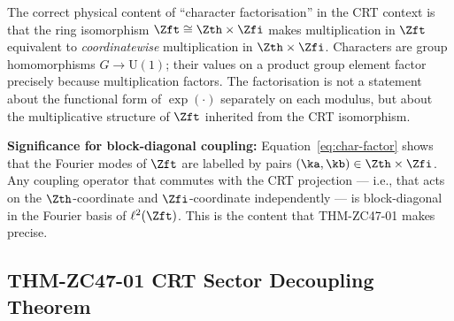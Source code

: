 \documentclass[12pt, a4paper]{article}
\begin{document}
\begin{derivedbox}[title={Commentary on LEM-ZC47-02}]
The correct physical content of ``character factorisation'' in
the CRT context is that the ring isomorphism $\Zft \cong \Zth \times \Zfi$
makes multiplication in $\Zft$ equivalent to \emph{coordinatewise}
multiplication in $\Zth \times \Zfi$.
Characters are group homomorphisms $G \to \mathrm{U}(1)$; their
values on a product group element factor precisely because
multiplication factors.
The factorisation is not a statement about the functional form
of $\exp(\cdot)$ separately on each modulus, but about the
multiplicative structure of $\Zft$ inherited from the CRT
isomorphism.

\textbf{Significance for block-diagonal coupling:}
Equation~\eqref{eq:char-factor} shows that the Fourier modes
of $\Zft$ are labelled by pairs $(\ka, \kb) \in \Zth \times \Zfi$.
Any coupling operator that commutes with the CRT projection ---
i.e., that acts on the $\Zth$-coordinate and $\Zfi$-coordinate
independently --- is block-diagonal in the Fourier basis of
$\ell^2(\Zft)$.
This is the content that THM-ZC47-01 makes precise.
\end{derivedbox}

\subsection{THM-ZC47-01 \quad CRT Sector Decoupling Theorem}
\label{sec:thm01}

\end{document}
